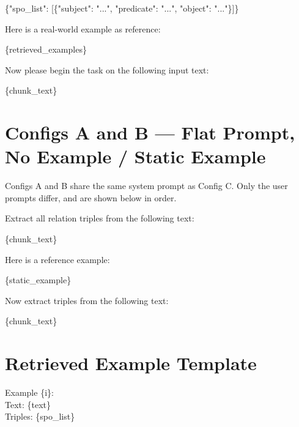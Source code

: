\begin{appendices}
\begin{tcolorbox}[sysprompt, title=System Prompt]
\medskip
\{"spo\_list": [\{"subject": "...", "predicate": "...", "object": "..."\}]\}
\end{tcolorbox}

\begin{tcolorbox}[userprompt, title=User Prompt]
Here is a real-world example as reference:

\medskip
\{retrieved\_examples\}

\medskip
Now please begin the task on the following input text:

\medskip
\{chunk\_text\}
\end{tcolorbox}


\section*{Configs A and B — Flat Prompt, No Example / Static Example}

Configs A and B share the same system prompt as Config C. Only the
user prompts differ, and are shown below in order.

\begin{tcolorbox}[userprompt, title=User Prompt — Config A (Zero-shot)]
Extract all relation triples from the following text:

\medskip
\{chunk\_text\}
\end{tcolorbox}

\begin{tcolorbox}[userprompt, title=User Prompt — Config B (Static Few-shot)]
Here is a reference example:

\medskip
\{static\_example\}

\medskip
Now extract triples from the following text:

\medskip
\{chunk\_text\}
\end{tcolorbox}


\section*{Retrieved Example Template}

\begin{tcolorbox}[sysprompt, title=Example Template]
Example \{i\}:\\
Text: \{text\}\\
Triples: \{spo\_list\}

\medskip
\end{tcolorbox}


\end{appendices}
